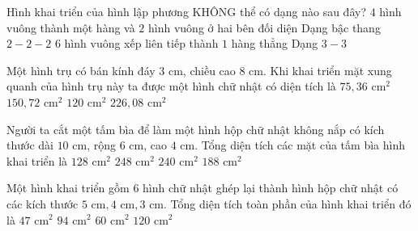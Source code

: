 \begin{ex} %
Hình khai triển của hình lập phương KHÔNG thể có dạng nào sau đây?
\choice
{$4$ hình vuông thành một hàng và $2$ hình vuông ở hai bên đối diện}
{Dạng bậc thang $2 - 2 - 2$}
{\True $6$ hình vuông xếp liên tiếp thành $1$ hàng thẳng}
{Dạng $3 - 3$}
\end{ex}

\begin{ex} %
Một hình trụ có bán kính đáy $3\text{ cm}$, chiều cao $8\text{ cm}$. Khi khai triển mặt xung quanh của hình trụ này ta được một hình chữ nhật có diện tích là
\choice
{$75{,}36\text{ cm}^2$}
{\True $150{,}72\text{ cm}^2$}
{$120\text{ cm}^2$}
{$226{,}08\text{ cm}^2$}
\end{ex}

\begin{ex} %
Người ta cắt một tấm bìa để làm một hình hộp chữ nhật không nắp có kích thước dài $10\text{ cm}$, rộng $6\text{ cm}$, cao $4\text{ cm}$. Tổng diện tích các mặt của tấm bìa hình khai triển là
\choice
{$128\text{ cm}^2$}
{$248\text{ cm}^2$}
{$240\text{ cm}^2$}
{\True $188\text{ cm}^2$}
\end{ex}

\begin{ex} %
Một hình khai triển gồm $6$ hình chữ nhật ghép lại thành hình hộp chữ nhật có các kích thước $5\text{ cm}, 4\text{ cm}, 3\text{ cm}$. Tổng diện tích toàn phần của hình khai triển đó là
\choice
{$47\text{ cm}^2$}
{\True $94\text{ cm}^2$}
{$60\text{ cm}^2$}
{$120\text{ cm}^2$}
\end{ex}

